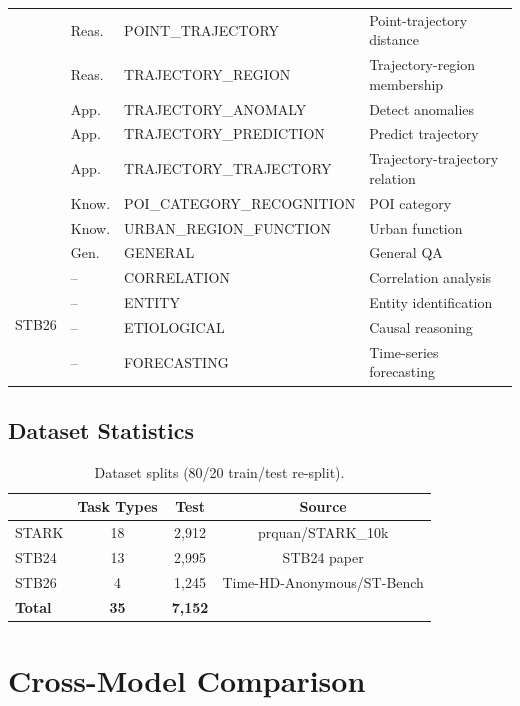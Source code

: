 \begin{table}[!htbp]
\begin{tabular}{llll}
 & Reas. & POINT\_TRAJECTORY & Point-trajectory distance \\
 & Reas. & TRAJECTORY\_REGION & Trajectory-region membership \\
 & App. & TRAJECTORY\_ANOMALY & Detect anomalies \\
 & App. & TRAJECTORY\_PREDICTION & Predict trajectory \\
 & App. & TRAJECTORY\_TRAJECTORY & Trajectory-trajectory relation \\
 & Know. & POI\_CATEGORY\_RECOGNITION & POI category \\
 & Know. & URBAN\_REGION\_FUNCTION & Urban function \\
 & Gen. & GENERAL & General QA \\
\midrule
\multirow{4}{*}{STB26}
 & -- & CORRELATION & Correlation analysis \\
 & -- & ENTITY & Entity identification \\
 & -- & ETIOLOGICAL & Causal reasoning \\
 & -- & FORECASTING & Time-series forecasting \\
\bottomrule
\end{tabular}
\end{table}

\subsection{Dataset Statistics}

\begin{table}[!htbp]
\centering
\caption{Dataset splits (80/20 train/test re-split).}
\label{tab:splits}
\small
\begin{tabular}{lccc}
\toprule
& Task Types & Test & Source \\
\midrule
STARK & 18 & 2{,}912 & prquan/STARK\_10k \\
STB24 & 13 & 2{,}995 & STB24 paper \\
STB26 & 4 & 1{,}245 & Time-HD-Anonymous/ST-Bench \\
\midrule
\textbf{Total} & \textbf{35} & \textbf{7{,}152} & \\
\bottomrule
\end{tabular}
\end{table}


\FloatBarrier
\section{Cross-Model Comparison}
\label{app:multi_model}

